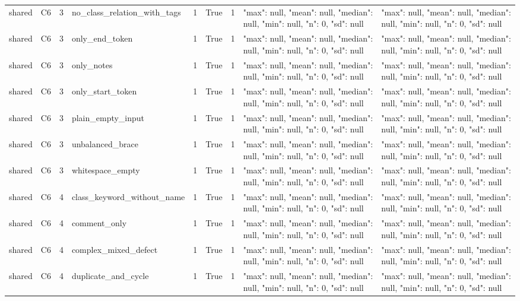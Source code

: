 \begin{tabular}{lllllllll}
shared & C6 & 3 & no\_class\_relation\_with\_tags & 1 & True & 1 & {"max": null, "mean": null, "median": null, "min": null, "n": 0, "sd": null} & {"max": null, "mean": null, "median": null, "min": null, "n": 0, "sd": null} \\
shared & C6 & 3 & only\_end\_token & 1 & True & 1 & {"max": null, "mean": null, "median": null, "min": null, "n": 0, "sd": null} & {"max": null, "mean": null, "median": null, "min": null, "n": 0, "sd": null} \\
shared & C6 & 3 & only\_notes & 1 & True & 1 & {"max": null, "mean": null, "median": null, "min": null, "n": 0, "sd": null} & {"max": null, "mean": null, "median": null, "min": null, "n": 0, "sd": null} \\
shared & C6 & 3 & only\_start\_token & 1 & True & 1 & {"max": null, "mean": null, "median": null, "min": null, "n": 0, "sd": null} & {"max": null, "mean": null, "median": null, "min": null, "n": 0, "sd": null} \\
shared & C6 & 3 & plain\_empty\_input & 1 & True & 1 & {"max": null, "mean": null, "median": null, "min": null, "n": 0, "sd": null} & {"max": null, "mean": null, "median": null, "min": null, "n": 0, "sd": null} \\
shared & C6 & 3 & unbalanced\_brace & 1 & True & 1 & {"max": null, "mean": null, "median": null, "min": null, "n": 0, "sd": null} & {"max": null, "mean": null, "median": null, "min": null, "n": 0, "sd": null} \\
shared & C6 & 3 & whitespace\_empty & 1 & True & 1 & {"max": null, "mean": null, "median": null, "min": null, "n": 0, "sd": null} & {"max": null, "mean": null, "median": null, "min": null, "n": 0, "sd": null} \\
shared & C6 & 4 & class\_keyword\_without\_name & 1 & True & 1 & {"max": null, "mean": null, "median": null, "min": null, "n": 0, "sd": null} & {"max": null, "mean": null, "median": null, "min": null, "n": 0, "sd": null} \\
shared & C6 & 4 & comment\_only & 1 & True & 1 & {"max": null, "mean": null, "median": null, "min": null, "n": 0, "sd": null} & {"max": null, "mean": null, "median": null, "min": null, "n": 0, "sd": null} \\
shared & C6 & 4 & complex\_mixed\_defect & 1 & True & 1 & {"max": null, "mean": null, "median": null, "min": null, "n": 0, "sd": null} & {"max": null, "mean": null, "median": null, "min": null, "n": 0, "sd": null} \\
shared & C6 & 4 & duplicate\_and\_cycle & 1 & True & 1 & {"max": null, "mean": null, "median": null, "min": null, "n": 0, "sd": null} & {"max": null, "mean": null, "median": null, "min": null, "n": 0, "sd": null} \\

\end{tabular}
